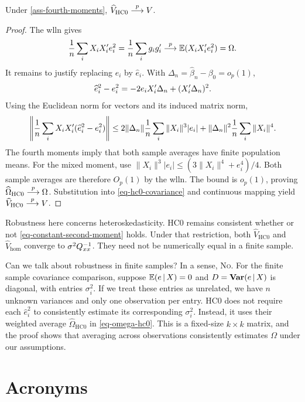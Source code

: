 \documentclass[a4paper,12pt]{article}
\begin{document}
\begin{proposition}[Consistency of HC0]
	Under \autoref{ass-fourth-moments},
	$\widehat V_{\mathrm{HC0}}\overset{p}{\longrightarrow} V$.
\end{proposition}
\begin{proof}
	The \gls{wlln} gives
	\begin{align}
		\frac1n\sum_iX_iX_i^{\prime} e_i^2
		= \frac1n\sum_i g_i g_i^{\prime}
		\overset{p}{\longrightarrow}
		\operatorname{\mathbb{E}}(X_iX_i^{\prime} e_i^2)
		= \Omega.
	\end{align}
	It remains to justify replacing $e_i$ by $\widehat e_i$.
	With $\Delta_n=\widehat\beta_n-\beta_0=o_p(1)$,
	\begin{align}
		\widehat e_i^2-e_i^2
		=-2e_iX_i^{\prime}\Delta_n+(X_i^{\prime}\Delta_n)^2.
	\end{align}
	Using the Euclidean norm for vectors and its induced matrix norm,
	\begin{align}
		\left\|\frac1n\sum_iX_iX_i^{\prime}(\widehat e_i^2-e_i^2)\right\|
		\le2\|\Delta_n\|\frac1n\sum_i\|X_i\|^3|e_i|
		+\|\Delta_n\|^2\frac1n\sum_i\|X_i\|^4.
	\end{align}
	The fourth moments imply that both sample averages have finite population means.
	For the mixed moment, use $\|X_i\|^3|e_i|\le(3\|X_i\|^4+e_i^4)/4$.
	Both sample averages are therefore $O_p(1)$ by the \gls{wlln}.
	The bound is $o_p(1)$, proving $\widehat\Omega_{\mathrm{HC0}}\overset{p}{\longrightarrow}\Omega$.
	Substitution into \eqref{eq-hc0-covariance} and continuous mapping yield $\widehat V_{\mathrm{HC0}}\overset{p}{\longrightarrow} V$.
\end{proof}

\begin{remark}
	Robustness here concerns heteroskedasticity.
	HC0 remains consistent whether or not \eqref{eq-constant-second-moment} holds.
	Under that restriction, both $\widehat V_{\mathrm{HC0}}$ and $\widehat V_{\mathrm{hom}}$
	converge to $\sigma^2Q_{xx}^{-1}$.
	They need not be numerically equal in a finite sample.
\end{remark}

\begin{remark}
	Can we talk about robustness in finite samples?
	In a sense, \textsc{No}.
	For the finite sample covariance comparison, suppose $\operatorname{\mathbb{E}}(e\mathpunct{}|\mathpunct{} X)=0$ and
	$D=\operatorname{\text{\textrm{\upshape\textbf{Var}}}}(e\mathpunct{}|\mathpunct{} X)$ is diagonal, with entries $\sigma_i^2$.
	If we treat these entries as unrelated, we have $n$ unknown variances and only one observation per entry.
	HC0 does not require each $\widehat e_i^2$ to consistently estimate its corresponding $\sigma_i^2$.
	Instead, it uses their weighted average $\widehat\Omega_{\mathrm{HC0}}$ in \eqref{eq-omega-hc0}.
	This is a fixed-size $k\times k$ matrix,
	and the proof shows that averaging across observations consistently estimates $\Omega$ under our assumptions.
\end{remark}

\vfill
\section*{Acronyms}
\printglossaries
\end{document}
